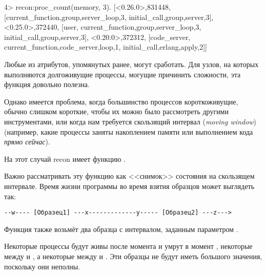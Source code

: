 \documentclass[11pt, oneside]{book}   	%
\begin{document}
\begin{VerbatimEshell}
4> recon:proc_count(memory, 3).
[{<0.26.0>,831448,
  [{current_function,{group,server_loop,3}},
   {initial_call,{group,server,3}}]},
 {<0.25.0>,372440,
  [user,
   {current_function,{group,server_loop,3}},
   {initial_call,{group,server,3}}]},
 {<0.20.0>,372312,
  [code_server,
   {current_function,{code_server,loop,1}},
   {initial_call,{erlang,apply,2}}]}]
\end{VerbatimEshell}

Любые из атрибутов, упомянутых ранее, могут сработать. Для узлов, на которых выполняются долгоживущие процессы, могущие причинить сложности, эта функция довольно полезна.

Однако имеется проблема, когда большинство процессов короткоживущие, обычно слишком короткие, чтобы их можно было рассмотреть другими инструментами, или когда нам требуется скользящий интервал (\emph{moving window}) (например, какие процессы заняты накоплением памяти или выполнением кода \emph{прямо сейчас}).

На этот случай recon имеет функцию  .

Важно рассматривать эту функцию как <<снимок>> состояния на скользящем интервале. Время жизни программы во время взятия образцов может выглядеть так:

\begin{Verbatim}
--w---- [Образец1] ---x-------------y----- [Образец2] ---z--->
\end{Verbatim}

Функция также возьмёт два образца с интервалом, заданным параметром .

Некоторые процессы будут живы после момента  и умрут в момент , некоторые между  и , а некоторые между  и . Эти образцы не будут иметь большого значения, поскольку они неполны.
\end{document}
